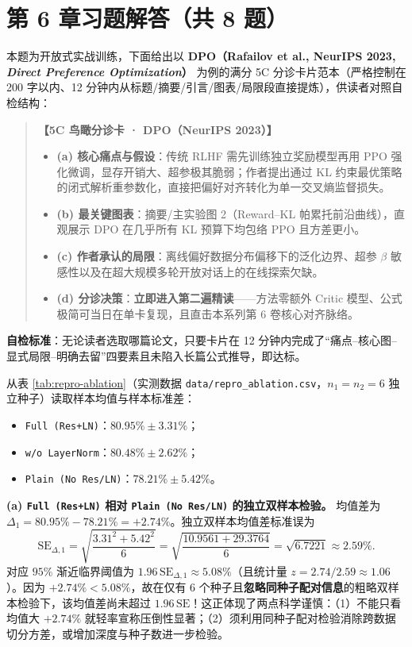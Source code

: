 \section*{第 6 章习题解答（共 8 题）}


本题为开放式实战训练，下面给出以 \textbf{DPO（Rafailov et al., NeurIPS 2023, \emph{Direct Preference Optimization}）} 为例的满分 5C 分诊卡片范本（严格控制在 200 字以内、12 分钟内从标题/摘要/引言/图表/局限段直接提炼），供读者对照自检结构：
\begin{quote}
\small
\textbf{【5C 鸟瞰分诊卡 · DPO（NeurIPS 2023）】}
\begin{itemize}
  \item \textbf{(a) 核心痛点与假设}：传统 RLHF 需先训练独立奖励模型再用 PPO 强化微调，显存开销大、超参极其脆弱；作者提出通过 KL 约束最优策略的闭式解析重参数化，直接把偏好对齐转化为单一交叉熵监督损失。
  \item \textbf{(b) 最关键图表}：摘要/主实验图 2（Reward--KL 帕累托前沿曲线），直观展示 DPO 在几乎所有 KL 预算下均包络 PPO 且方差更小。
  \item \textbf{(c) 作者承认的局限}：离线偏好数据分布偏移下的泛化边界、超参 $\beta$ 敏感性以及在超大规模多轮开放对话上的在线探索欠缺。
  \item \textbf{(d) 分诊决策}：\textbf{立即进入第二遍精读}——方法零额外 Critic 模型、公式极简可当日在单卡复现，且直击本系列第 6 卷核心对齐脉络。
\end{itemize}
\end{quote}
\textbf{自检标准}：无论读者选取哪篇论文，只要卡片在 12 分钟内完成了“痛点--核心图--显式局限--明确去留”四要素且未陷入长篇公式推导，即达标。


从表 \ref{tab:repro-ablation}（实测数据 \texttt{data/repro\_ablation.csv}，$n_1 = n_2 = 6$ 独立种子）读取样本均值与样本标准差：
\begin{itemize}
  \item \texttt{Full (Res+LN)}：$80.95\% \pm 3.31\%$；
  \item \texttt{w/o LayerNorm}：$80.48\% \pm 2.62\%$；
  \item \texttt{Plain (No Res/LN)}：$78.21\% \pm 5.42\%$。
\end{itemize}

\textbf{(a) \texttt{Full (Res+LN)} 相对 \texttt{Plain (No Res/LN)} 的独立双样本检验。}
均值差为 $\Delta_1 = 80.95\% - 78.21\% = \mathbf{+2.74\%}$。独立双样本均值差标准误为
\[
  \mathrm{SE}_{\Delta, 1}
  = \sqrt{\frac{3.31^2 + 5.42^2}{6}}
  = \sqrt{\frac{10.9561 + 29.3764}{6}}
  = \sqrt{6.7221} \approx \mathbf{2.59\%}.
\]
对应 $95\%$ 渐近临界阈值为 $1.96\,\mathrm{SE}_{\Delta, 1} \approx \mathbf{5.08\%}$（且统计量 $z = 2.74 / 2.59 \approx 1.06$）。因为 $+2.74\% < 5.08\%$，故在仅有 $6$ 个种子且\textbf{忽略同种子配对信息}的粗略双样本检验下，该均值差尚未超过 $1.96\,\mathrm{SE}$！这正体现了两点科学谨慎：（1）不能只看均值大 $+2.74\%$ 就轻率宣称压倒性显著；（2）须利用同种子配对检验消除跨数据切分方差，或增加深度与种子数进一步检验。

